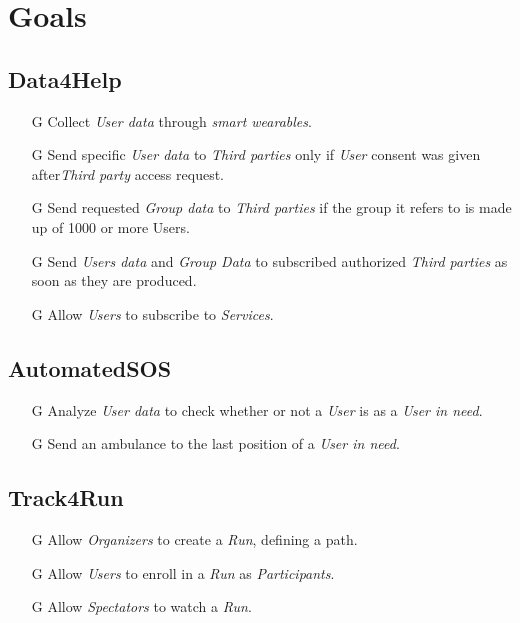 \documentclass[../../rasd.tex]{subfiles}
\begin{document}
\section{Goals}

				\subsection{Data4Help}
					\begin{itemize}
						
						\item[G\subs{1}]Collect \textit{User data} through \textit{smart wearables}.
						
						\item[G\subs{2}]Send specific \textit{User data} to \textit{Third parties} only if \textit{User} consent was given after\textit{Third party} access request.
						\item[G\subs{3}]Send requested \textit{Group data} to \textit{Third parties} if the group it refers to is made up of 1000 or more Users.

						\item[G\subs{4}]Send \textit{Users data} and \textit{Group Data} to subscribed authorized \textit{Third parties} as soon as they are produced.
						
						\item[G\subs{5}]Allow \textit{Users} to subscribe to \textit{Services}.		
						
					\end{itemize}

				\subsection{AutomatedSOS}
					\begin{itemize}
						\item[G\subs{6}]Analyze \textit{User data} to check whether or not a \textit{User} is as a \textit{User in need}.
						\item[G\subs{7}]Send an ambulance to the last position of a \textit{User in need}.
					\end{itemize}

				\subsection{Track4Run}
					\begin{itemize}
						\item[G\subs{8}]Allow \textit{Organizers} to create a \textit{Run}, defining a path.
						\item[G\subs{9}]Allow \textit{Users} to enroll in a \textit{Run} as \textit{Participants}. 
						\item[G\subs{10}]Allow \textit{Spectators} to watch a \textit{Run}.
					\end{itemize}
\end{document}
